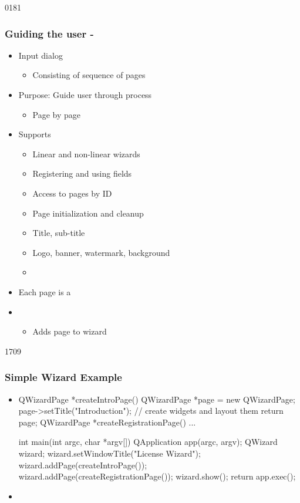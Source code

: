 \begin{slide}{0181}\frametitle{Guiding the user - }
\begin{itemize}
\item Input dialog
  \begin{itemize}
  \item Consisting of sequence of pages
  \end{itemize}
\item Purpose: Guide user through process
  \begin{itemize}
  \item Page by page
  \end{itemize}
\item Supports
  \begin{itemize}
  \item Linear and non-linear wizards
  \item Registering and using fields
  \item Access to pages by ID
  \item Page initialization and cleanup
  \item Title, sub-title
  \item Logo, banner, watermark, background
  \item {}
  \end{itemize}

\item Each page is a 
\item {}
  \begin{itemize}
  \item Adds page to wizard
  \end{itemize}
\end{itemize}
\end{slide}

\begin{slide}[fragile]{1709}
  \frametitle{Simple Wizard Example}
  \begin{itemize}
  \item[]
    \begin{cpp}
QWizardPage *createIntroPage() {
  QWizardPage *page = new QWizardPage;
  page->setTitle("Introduction");
  // create widgets and layout them
  return page;
}
QWizardPage *createRegistrationPage() { ... }

int main(int argc, char *argv[]) {
  QApplication app(argc, argv); 
  QWizard wizard;
  wizard.setWindowTitle("License Wizard");
  wizard.addPage(createIntroPage());
  wizard.addPage(createRegistrationPage()); 
  wizard.show();
  return app.exec();
}      
    \end{cpp}

  \item {}
  \end{itemize}
\end{slide}

